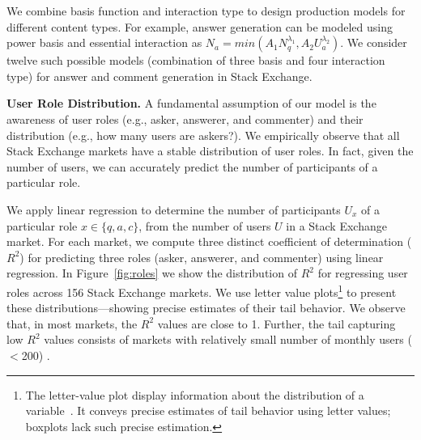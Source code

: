 \begin{table}[h!]
\begin{tabular}{m{}c}
\begin{minipage}{.17\textwidth}
    \end{minipage}
    \\
    \bottomrule
  \end{tabular}
  \vspace{-\baselineskip}
\end{table}

We combine basis function and interaction type to design production models for different content types. For example, answer generation can be modeled using power basis and essential interaction as $N_a = min(A_1N_q^{\lambda_1},A_2U_a^{\lambda_2})$. We consider twelve such possible models (combination of three basis and four interaction type) for answer and comment generation in Stack Exchange.

\textbf{User Role Distribution.} A fundamental assumption of our model is the awareness of user roles (e.g., asker, answerer, and commenter) and their distribution (e.g., how many users are askers?). We empirically observe that all Stack Exchange markets have a stable distribution of user roles. In fact, given the number of users, we can accurately predict the number of participants of a particular role. 

We apply linear regression to determine the number of participants $U_x$ of a particular role $x \in \{q, a, c\}$, from the number of users $U$ in a Stack Exchange market. For each market, we compute three distinct coefficient of determination ($R^2$) for predicting three roles (asker, answerer, and commenter) using linear regression. In Figure~\ref{fig:roles} we show the distribution of $R^2$ for regressing user roles across 156 Stack Exchange markets. We use letter value plots\footnote{The letter-value plot display information about the distribution of a variable~\cite{Hofmann2017}. It conveys precise estimates of tail behavior using letter values; boxplots lack such precise estimation.} to present these distributions---showing precise estimates of their tail behavior. We observe that, in most markets, the $R^2$ values are close to 1. Further, the tail capturing low $R^2$ values consists of markets with relatively small number of monthly users ($<$200) .

